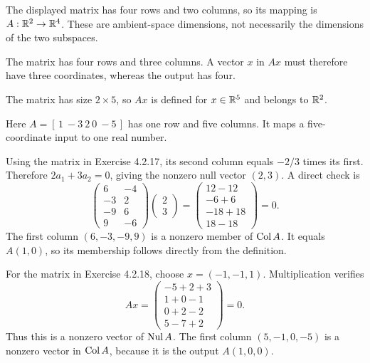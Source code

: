 The displayed matrix has four rows and two columns, so its mapping is
$A:\mathbb{R}^2\to\mathbb{R}^4$.
These are ambient-space dimensions, not necessarily the dimensions of the two subspaces.

The matrix has four rows and three columns. A vector $x$ in $Ax$ must
therefore have three coordinates, whereas the output has four.

The matrix has size $2\times5$, so $Ax$ is defined for $x\in\mathbb{R}^5$ and
belongs to $\mathbb{R}^2$.

Here $A=[\,1\ -3\ 2\ 0\ -5\,]$ has one row and five columns.
It maps a five-coordinate input to one real number.

Using the matrix in Exercise 4.2.17, its second column equals $-2/3$ times
its first. Therefore $2a_1+3a_2=0$, giving the nonzero null vector $(2,3)$.
A direct check is
\[
 \begin{pmatrix}6&-4\\-3&2\\-9&6\\9&-6\end{pmatrix}
 \begin{pmatrix}2\\3\end{pmatrix}
 =\begin{pmatrix}12-12\\-6+6\\-18+18\\18-18\end{pmatrix}=0.
\]
The first column $(6,-3,-9,9)$ is a nonzero member of $\operatorname{Col} A$.
It equals $A(1,0)$, so its membership follows directly from the definition.

For the matrix in Exercise 4.2.18, choose $x=(-1,-1,1)$.
Multiplication verifies
\[
 Ax=\begin{pmatrix}-5+2+3\\1+0-1\\0+2-2\\5-7+2\end{pmatrix}=0.
\]
Thus this is a nonzero vector of $\operatorname{Nul} A$.
The first column $(5,-1,0,-5)$ is a nonzero vector in $\operatorname{Col} A$, because
it is the output $A(1,0,0)$.

